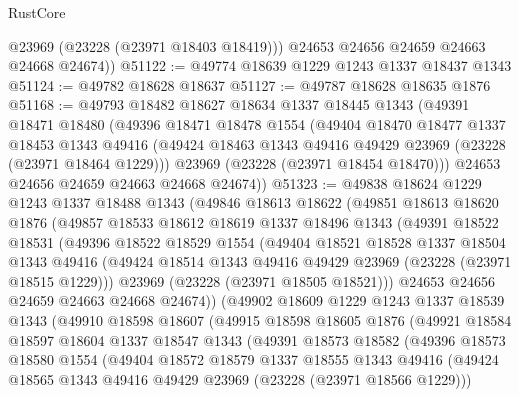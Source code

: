 \begin{lexlean}{RustCore}
\begin{coremodule}
          @23969
          (@23228 (@23971 @18403 @18419)))
        @24653
        @24656
        @24659
        @24663
        @24668
        @24674))
@51122 := @49774 @18639 @1229 @1243 @1337 @18437 @1343
@51124 := @49782 @18628 @18637
@51127 := @49787 @18628 @18635 @1876
@51168 := @49793
    @18482
    @18627
    @18634
    @1337
    @18445
    @1343
    (@49391
      @18471
      @18480
      (@49396
        @18471
        @18478
        @1554
        (@49404
          @18470
          @18477
          @1337
          @18453
          @1343
          @49416
          (@49424 @18463 @1343 @49416 @49429 @23969 (@23228 (@23971 @18464 @1229)))
          @23969
          (@23228 (@23971 @18454 @18470)))
        @24653
        @24656
        @24659
        @24663
        @24668
        @24674))
@51323 := @49838
    @18624
    @1229
    @1243
    @1337
    @18488
    @1343
    (@49846
      @18613
      @18622
      (@49851
        @18613
        @18620
        @1876
        (@49857
          @18533
          @18612
          @18619
          @1337
          @18496
          @1343
          (@49391
            @18522
            @18531
            (@49396
              @18522
              @18529
              @1554
              (@49404
                @18521
                @18528
                @1337
                @18504
                @1343
                @49416
                (@49424 @18514 @1343 @49416 @49429 @23969 (@23228 (@23971 @18515 @1229)))
                @23969
                (@23228 (@23971 @18505 @18521)))
              @24653
              @24656
              @24659
              @24663
              @24668
              @24674))
          (@49902
            @18609
            @1229
            @1243
            @1337
            @18539
            @1343
            (@49910
              @18598
              @18607
              (@49915
                @18598
                @18605
                @1876
                (@49921
                  @18584
                  @18597
                  @18604
                  @1337
                  @18547
                  @1343
                  (@49391
                    @18573
                    @18582
                    (@49396
                      @18573
                      @18580
                      @1554
                      (@49404
                        @18572
                        @18579
                        @1337
                        @18555
                        @1343
                        @49416
                        (@49424 @18565 @1343 @49416 @49429 @23969 (@23228 (@23971 @18566 @1229)))

\end{coremodule}
\end{lexlean}
